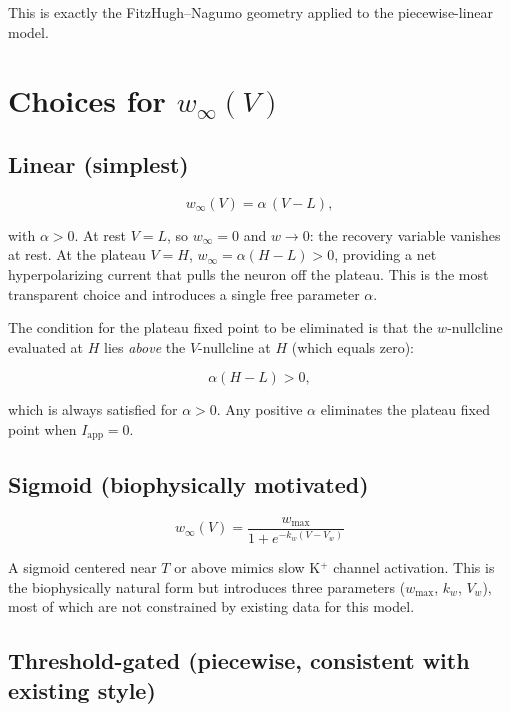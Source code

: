 \documentclass[11pt]{article}
\begin{document}
This is exactly the FitzHugh--Nagumo geometry applied to the piecewise-linear model.

\section{Choices for \texorpdfstring{$w_\infty(V)$}{w\_inf(V)}}
\label{sec:choices}

\subsection{Linear (simplest)}

\begin{equation}
    w_\infty(V) = \alpha\,(V - L),
\end{equation}

with $\alpha > 0$. At rest $V = L$, so $w_\infty = 0$ and $w \to 0$: the recovery
variable vanishes at rest. At the plateau $V = H$,
$w_\infty = \alpha(H - L) > 0$, providing a net hyperpolarizing current that
pulls the neuron off the plateau. This is the most transparent choice and
introduces a single free parameter $\alpha$.

The condition for the plateau fixed point to be eliminated is that the $w$-nullcline
evaluated at $H$ lies \emph{above} the $V$-nullcline at $H$ (which equals zero):

\begin{equation}
    \alpha(H - L) > 0,
\end{equation}

which is always satisfied for $\alpha > 0$. Any positive $\alpha$ eliminates the
plateau fixed point when $I_{\mathrm{app}} = 0$.

\subsection{Sigmoid (biophysically motivated)}

\begin{equation}
    w_\infty(V) = \frac{w_{\max}}{1 + e^{-k_w(V - V_{w})}}
\end{equation}

A sigmoid centered near $T$ or above mimics slow K$^+$ channel activation. This is
the biophysically natural form but introduces three parameters ($w_{\max}$, $k_w$,
$V_w$), most of which are not constrained by existing data for this model.

\subsection{Threshold-gated (piecewise, consistent with existing style)}
\end{document}
